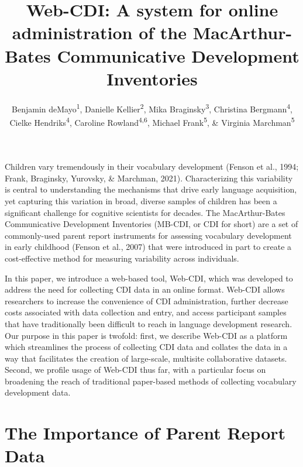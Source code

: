 \documentclass[
  english,
  ,man,floatsintext]{apa6}
\title{Web-CDI: A system for online administration of the MacArthur-Bates Communicative Development Inventories}
\author{Benjamin deMayo\textsuperscript{1}, Danielle Kellier\textsuperscript{2}, Mika Braginsky\textsuperscript{3}, Christina Bergmann\textsuperscript{4}, Cielke Hendriks\textsuperscript{4}, Caroline Rowland\textsuperscript{4,6}, Michael Frank\textsuperscript{5}, \& Virginia Marchman\textsuperscript{5}}
\date{}
\affiliation{\vspace{0.5cm}\textsuperscript{1} Princeton University\\\textsuperscript{2} University of Pennsylvania\\\textsuperscript{3} Massachusetts Institute of Technology\\\textsuperscript{4} Max Planck Institute for Psycholinguistics\\\textsuperscript{5} Stanford University\\\textsuperscript{6} Radboud University}
\begin{document}
\maketitle

Children vary tremendously in their vocabulary development (Fenson et al., 1994; Frank, Braginsky, Yurovsky, \& Marchman, 2021). Characterizing this variability is central to understanding the mechanisms that drive early language acquisition, yet capturing this variation in broad, diverse samples of children has been a significant challenge for cognitive scientists for decades. The MacArthur-Bates Communicative Development Inventories (MB-CDI, or CDI for short) are a set of commonly-used parent report instruments for assessing vocabulary development in early childhood (Fenson et al., 2007) that were introduced in part to create a cost-effective method for measuring variability across individuals.

In this paper, we introduce a web-based tool, Web-CDI, which was developed to address the need for collecting CDI data in an online format. Web-CDI allows researchers to increase the convenience of CDI administration, further decrease costs associated with data collection and entry, and access participant samples that have traditionally been difficult to reach in language development research. Our purpose in this paper is twofold: first, we describe Web-CDI as a platform which streamlines the process of collecting CDI data and collates the data in a way that facilitates the creation of large-scale, multisite collaborative datasets. Second, we profile usage of Web-CDI thus far, with a particular focus on broadening the reach of traditional paper-based methods of collecting vocabulary development data.

\hypertarget{the-importance-of-parent-report-data}{%
\section{The Importance of Parent Report Data}\label{the-importance-of-parent-report-data}}
\end{document}
